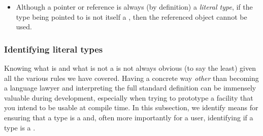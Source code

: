 \begin{itemize}
{\begin{emcppslisting}
static_assert(processByValue(Lt(7)) == 0, "");
    // Error, but OK (due to elided copy) on some platforms

constexpr Lt s{7};  // braced-initialized aggregate

static_assert(processByValue(s) == 0, "");  // Error, non(ù{}ù) copy ctor
\end{emcppslisting}


\noindent In the code example above, we have an \emph{aggregate} ,
\lstinline!Lt!, for which we have explicitly declared a
non\lstinline!constexpr! copy constructor. We then defined a valid
\lstinline!constexpr! function, \lstinline!processByValue!, taking an
\lstinline!Lt! (by value) as its only argument. Invoking the function by
constructing a object of \lstinline!Lt! from a literal \lstinline!int! value
enables the compiler to elide the copy.  Platforms where the copy is elided
might allow this evaluation at compile time, while on others there will be an error.
When we consider using an independently constructed \lstinline!constexpr! variable,
\lstinline!s!, the \lstinline!copy! can no longer be elided, and, since the
copy constructor is declared explicitly to be non\lstinline!constexpr!, the
compile-time assertion fails to compile on all platforms; see .}

\item{Although a pointer or reference is always (by definition) a \emph{literal type}, if the type being pointed to is not itself a , then the referenced object cannot be used.}
\end{itemize}

\subsubsection[Identifying literal types]{Identifying literal types}\label{identifying-literal-types}

Knowing what is and what is not a  is not always
obvious (to say the least) given all the various rules we have covered.
Having a concrete way \emph{other} than becoming a language lawyer and
interpreting the full standard definition can be immensely valuable
during development, especially when trying to prototype a facility that
you intend to be usable at compile time. In this subsection, we identify
means for ensuring that a type is a  and, often
more importantly for a user, identifying if a type is a
.

